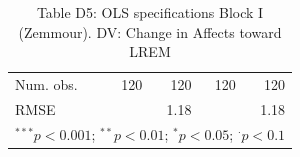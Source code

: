 \begin{table}[h!]
\begin{center}
\begin{footnotesize}
\begin{tabular}{l D{.}{.}{3.3} D{.}{.}{3.7} D{.}{.}{3.3} D{.}{.}{3.3}}
Num. obs.                              & 120                    & 120                     & 120                    & 120                     \\
RMSE                                   &                        & 1.18                    &                        & 1.18                    \\
\bottomrule
{}
\end{tabular}
\end{footnotesize}
\caption{Table D5: OLS specifications Block I (Zemmour). DV: Change in Affects toward LREM}
\label{table:coefficients}
\end{center}
\end{table}
